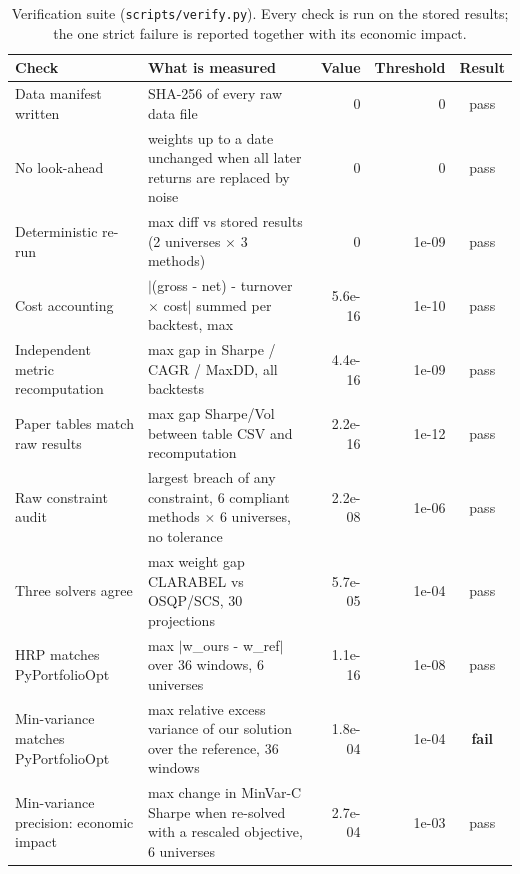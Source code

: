 \begin{table}[!htbp]\centering\small
\caption{Verification suite (\texttt{scripts/verify.py}). Every check is run on the stored results; the one strict failure is reported together with its economic impact.}\label{tab:verify}
\footnotesize\begin{tabular}{p{3.4cm}p{7.4cm}rrc}\toprule
Check & What is measured & Value & Threshold & Result\\\midrule
Data manifest written & SHA-256 of every raw data file & 0 & 0 & pass\\
No look-ahead & weights up to a date unchanged when all later returns are replaced by noise & 0 & 0 & pass\\
Deterministic re-run & max diff vs stored results (2 universes $\times$ 3 methods) & 0 & 1e-09 & pass\\
Cost accounting & $|$(gross - net) - turnover $\times$ cost$|$ summed per backtest, max & 5.6e-16 & 1e-10 & pass\\
Independent metric recomputation & max gap in Sharpe / CAGR / MaxDD, all backtests & 4.4e-16 & 1e-09 & pass\\
Paper tables match raw results & max gap Sharpe/Vol between table CSV and recomputation & 2.2e-16 & 1e-12 & pass\\
Raw constraint audit & largest breach of any constraint, 6 compliant methods $\times$ 6 universes, no tolerance & 2.2e-08 & 1e-06 & pass\\
Three solvers agree & max weight gap CLARABEL vs OSQP/SCS, 30 projections & 5.7e-05 & 1e-04 & pass\\
HRP matches PyPortfolioOpt & max $|$w\_ours - w\_ref$|$ over 36 windows, 6 universes & 1.1e-16 & 1e-08 & pass\\
Min-variance matches PyPortfolioOpt & max relative excess variance of our solution over the reference, 36 windows & 1.8e-04 & 1e-04 & \textbf{fail}\\
Min-variance precision: economic impact & max change in MinVar-C Sharpe when re-solved with a rescaled objective, 6 universes & 2.7e-04 & 1e-03 & pass\\
\bottomrule\end{tabular}\end{table}